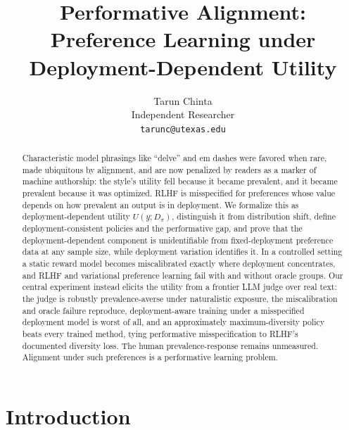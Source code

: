 ﻿\documentclass[11pt]{article}
\title{Performative Alignment: Preference Learning under Deployment-Dependent Utility}
\author{Tarun Chinta \\
  Independent Researcher \\
  \texttt{tarunc@utexas.edu}}
\begin{document}
\maketitle


\begin{abstract}
Characteristic model phrasings like ``delve'' and em dashes were favored when rare, made ubiquitous by alignment, and are now penalized by readers as a marker of machine authorship: the style's utility fell because it became prevalent, and it became prevalent because it was optimized. RLHF is misspecified for preferences whose value depends on how prevalent an output is in deployment. We formalize this as deployment-dependent utility \(U(y; D_\pi)\), distinguish it from distribution shift, define deployment-consistent policies and the performative gap, and prove that the deployment-dependent component is unidentifiable from fixed-deployment preference data at any sample size, while deployment variation identifies it. In a controlled setting a static reward model becomes miscalibrated exactly where deployment concentrates, and RLHF and variational preference learning fail with and without oracle groups. Our central experiment instead elicits the utility from a frontier LLM judge over real text: the judge is robustly prevalence-averse under naturalistic exposure, the miscalibration and oracle failure reproduce, deployment-aware training under a misspecified deployment model is worst of all, and an approximately maximum-diversity policy beats every trained method, tying performative misspecification to RLHF's documented diversity loss. The human prevalence-response remains unmeasured. Alignment under such preferences is a performative learning problem.
\end{abstract}

\section{Introduction}
\label{sec:intro}
\end{document}
